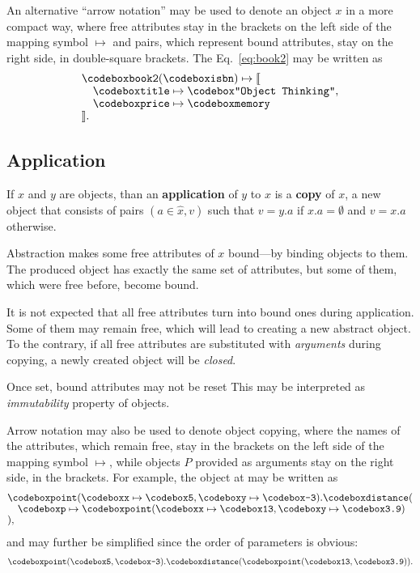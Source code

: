 An alternative ``arrow notation'' may be used to denote an object $x$ in a more
compact way, where free attributes stay in the brackets on the left side of the
mapping symbol $\mapsto$ and pairs,
which represent bound attributes, stay on the right side, in double-square brackets.
The Eq.~\ref{eq:book2} may be written as
\begin{equation}\label{eq:book2-compact}
\begin{split}
& \f{book2}(\f{isbn}) \mapsto \llbracket \br
& \quad \f{title} \mapsto \f{"Object Thinking"}, \br
& \quad \f{price} \mapsto \f{memory} \br
& \rrbracket. \\
\end{split}
\end{equation}

\subsection{Application}

\begin{eodefinition}\label{def:application}
If $x$ and $y$ are objects, than an \textbf{application} of $y$ to $x$ is
  a \textbf{copy} of $x$, a new object that consists of pairs $(a\in\hat{x},v)$ such that
  $v=y.a$ if $x.a=\emptyset$ and $v=x.a$ otherwise.
\end{eodefinition}

Abstraction makes some free attributes of $x$ bound---by binding objects to them.
The produced object has exactly the same set of attributes, but some of them,
which were free before, become bound.

It is not expected that all free attributes turn into bound ones during application.
Some of them may remain free, which will lead
to creating a new abstract object. To the contrary,
if all free attributes are substituted with \emph{arguments} during copying,
a newly created object will be \emph{closed}.

Once set, bound attributes may not be reset
This may be interpreted as \emph{immutability} property of objects.

Arrow notation may also be used to denote object copying,
where the names of the attributes, which remain free, stay in the brackets
on the left side of the mapping symbol $\mapsto$,
while objects $P$ provided as arguments stay on the right side,
in the brackets. For example, the object at  may be written as
\begin{equation}\label{eq:point}
\begin{split}
& \f{point}(\f{x} \mapsto \f{5}, \f{y} \mapsto \f{-3}).\f{distance}(\br
& \quad \f{p} \mapsto \f{point}(\f{x} \mapsto \f{13}, \f{y} \mapsto \f{3.9}) \br
& ),
\end{split}
\end{equation}
and may further be simplified since the order of parameters is obvious:
\begin{equation}
\begin{split}
\f{point}(\f{5}, \f{-3}).\f{distance}(\f{point}(\f{13}, \f{3.9})).
\end{split}
\end{equation}

